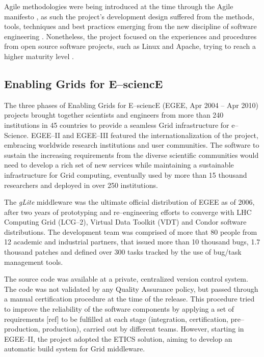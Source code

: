 \documentclass[journal]{IEEEtran}
\begin{document}
Agile methodologies were being introduced at the time
through the Agile manifesto \cite{agile-manifesto}, as such the project's
development design suffered from the methods, tools, techniques and best
practices emerging from the new discipline of software engineering
\cite{agile}. Nonetheless, the project focused on the experiences and procedures
from open source software projects, such as Linux and Apache, trying to reach a
higher maturity level \cite{cmm}.

\subsection{Enabling Grids for E--sciencE}

The three phases of Enabling Grids for E--sciencE (EGEE, Apr 2004 -- Apr 2010)
\cite{cordis:egee, cordis:egee2, cordis:egee3} projects brought together
scientists and engineers from more than 240 institutions in 45 countries to
provide a seamless Grid infrastructure for e--Science. EGEE--II and EGEE--III
featured the internationalization of the project, embracing worldwide research
institutions and user communities. The software to sustain the increasing
requirements from the diverse scientific communities would need to develop a
rich set of new services while maintaining a sustainable infrastructure for
Grid computing, eventually used by more than 15 thousand researchers and deployed in
over 250 institutions.

The {\sl gLite} middleware \cite{glite} was the ultimate
official distribution of EGEE as of 2006, after two years of prototyping and
re--engineering efforts to converge with LHC Computing Grid (LCG--2), Virtual
Data Toolkit (VDT) and Condor \cite{condor} software distributions. The
development team was comprised of more that 80 people from 12 academic and
industrial partners, that issued more than 10 thousand bugs, 1.7 thousand patches and
defined over 300 tasks tracked by the use of bug/task management tools.

The
source code was available at a private, centralized version control system.
The code was not validated by any Quality Assurance policy, but passed through a manual
certification procedure at the time of the release. This procedure tried to
improve the reliability of the software components by applying a set of
requirements [ref] to be fulfilled at each stage (integration, certification,
pre--production, production), carried out by different teams. However, starting in
EGEE--II, the project adopted the ETICS solution, aiming to develop
an automatic build system for Grid middleware.
\end{document}
